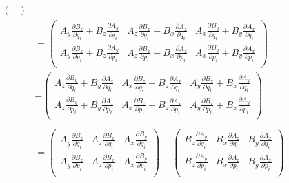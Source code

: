 \documentclass[a4paper]{article}
\begin{document}
\begin{answer}[Punto 23]
\begin{align*}
\begin{pmatrix}
        \end{pmatrix}\\
        &= \begin{pmatrix}
            A_y \frac{\partial  B_z}{\partial q_{i}}  + B_z \frac{\partial  A_y}{\partial q_{i}}  &  A_z \frac{\partial  B_x}{\partial q_{i}}  + B_x \frac{\partial  A_z}{\partial q_{i}}  &  A_x \frac{\partial  B_y}{\partial q_{i}}  + B_y \frac{\partial  A_x}{\partial q_{i}}  \\
              A_y \frac{\partial  B_z}{\partial p_{i}}  + B_z \frac{\partial  A_y}{\partial p_{i}}  &  A_z \frac{\partial  B_x}{\partial p_{i}}  + B_x \frac{\partial  A_z}{\partial p_{i}}  &  A_x \frac{\partial  B_y}{\partial p_{i}}  + B_y \frac{\partial  A_x}{\partial p_{i}}  \\
        \end{pmatrix} \\
        &- \begin{pmatrix}
            A_z \frac{\partial  B_y}{\partial q_{i}}  + B_y \frac{\partial  A_z}{\partial q_{i}}  &  A_x \frac{\partial  B_z}{\partial q_{i}}  + B_z \frac{\partial  A_x}{\partial q_{i}}  &  A_y \frac{\partial  B_x}{\partial q_{i}}  + B_x \frac{\partial  A_y}{\partial q_{i}}  \\
              A_z \frac{\partial  B_y}{\partial p_{i}}  + B_y \frac{\partial  A_z}{\partial p_{i}}  &  A_x \frac{\partial  B_z}{\partial p_{i}}  + B_z \frac{\partial  A_x}{\partial p_{i}}  &  A_y \frac{\partial  B_x}{\partial p_{i}}  + B_x \frac{\partial  A_y}{\partial p_{i}}  \\
        \end{pmatrix} \\\\
        & =\begin{pmatrix}
            A_y \frac{\partial  B_z}{\partial q_{i}}  & A_z \frac{\partial  B_x}{\partial q_{i}}  &  A_x \frac{\partial  B_y}{\partial q_{i}}  \\
              A_y \frac{\partial  B_z}{\partial p_{i}}  &  A_z \frac{\partial  B_x}{\partial p_{i}}  &  A_x \frac{\partial  B_y}{\partial p_{i}}  \\
        \end{pmatrix} + \begin{pmatrix}
            B_z \frac{\partial  A_y}{\partial q_{i}}   &  B_x \frac{\partial  A_z}{\partial q_{i}}   &  B_y \frac{\partial  A_x}{\partial q_{i}}   \\
              B_z \frac{\partial  A_y}{\partial p_{i}}   &  B_x \frac{\partial  A_z}{\partial p_{i}}   &  B_y \frac{\partial  A_x}{\partial p_{i}}   \\

\end{pmatrix}
\end{align*}
\end{answer}
\end{document}
